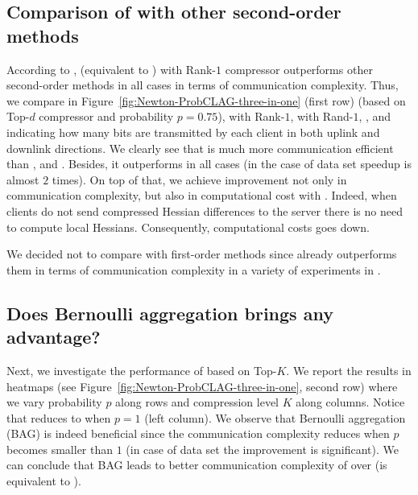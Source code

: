 \documentclass[11pt]{article}
\begin{document}
	\subsection{Comparison of  with other second-order methods}
	According to \citep{FedNL2021},  (equivalent to ) with Rank-$1$ compressor outperforms other second-order methods in all cases in terms of communication complexity. Thus, we compare in Figure~\ref{fig:Newton-ProbCLAG-three-in-one} (first row)  (based on Top-$d$ compressor and probability $p=0.75$),  with Rank-$1$,  with Rand-$1$, , and  indicating how many bits are transmitted by each client in both uplink and downlink directions. We clearly see that  is much more communication efficient than ,  and . Besides, it outperforms  in all cases (in the case of  data set speedup is almost $2$ times). On top of that, we achieve improvement not only in communication complexity, but also in computational cost with . Indeed, when clients do not send compressed Hessian differences to the server there is no need to compute local Hessians. Consequently, computational costs goes down.
	
	We decided not to compare  with first-order methods since  already outperforms them in terms of communication complexity in a variety of experiments in \citep{FedNL2021}.
	
	
	\subsection{Does Bernoulli aggregation brings any advantage?}
	Next, we investigate the performance of  based on Top-$K$. We report the results in 
	heatmaps (see Figure~\ref{fig:Newton-ProbCLAG-three-in-one}, second row) where we vary probability $p$ along rows and compression level $K$ along columns. Notice that  reduces to  when $p=1$ (left column). We observe that Bernoulli aggregation (BAG) is indeed beneficial since the communication complexity reduces when $p$ becomes smaller than $1$ (in case of  data set the improvement is significant). We can conclude that BAG leads to better communication complexity of  over  (is equivalent to ).
	
\end{document}
